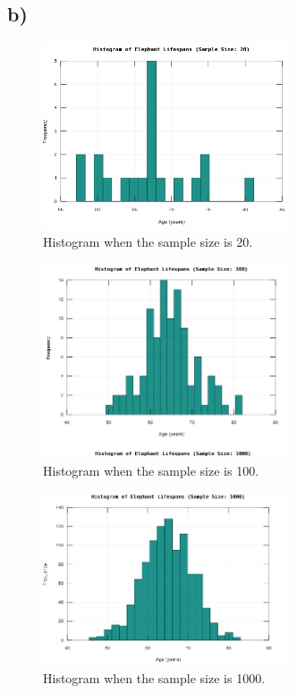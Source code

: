 \documentclass[12pt]{article}
\begin{document}
\subsection*{b)}
\begin{figure}[H]
    \centering
    \includegraphics[width=0.65\textwidth]{plots/plot for 20.jpg}
    \caption{Histogram when the sample size is 20.}
    \label{fig:example_b}
\end{figure}
\begin{figure}[H]
    \centering
    \includegraphics[width=0.65\textwidth]{plots/plot for 100.jpg}
    \caption{Histogram when the sample size is 100.}
\end{figure}
\begin{figure}[H]
    \centering
    \includegraphics[width=0.65\textwidth]{plots/plot for 1000.jpg}
    \caption{Histogram when the sample size is 1000.}
\end{figure}
\end{document}
